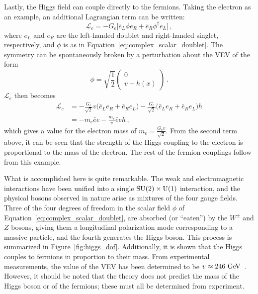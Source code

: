 Lastly, the Higgs field can couple directly to the fermions.
Taking the electron as an example, an additional Lagrangian term can be written:
\begin{equation}
\mathcal{L}_e = -G_e \big[\bar{e}_{L}\phi e_R+\bar{e}_R\phi^{\dagger}e_L\big]\,,
\end{equation}
where $e_L$ and $e_R$ are the left-handed doublet and right-handed singlet, respectively, and $\phi$ is as in Equation~\ref{eq:complex_scalar_doublet}.
The symmetry can be spontaneously broken by a perturbation about the VEV of the form
\begin{equation}
  \phi = \sqrt{\frac{1}{2}}
  \begin{pmatrix}
  0 \\ v+h(x)
  \end{pmatrix}\,.
\end{equation}
$\mathcal{L}_e$ then becomes
\begin{equation}
  \begin{aligned}
    \mathcal{L}_e &= -\frac{G_e}{\sqrt{2}}v\big(\bar{e}_{L}e_{R}+\bar{e}_{R}e_{L}\big) - \frac{G_e}{\sqrt{2}}\big(\bar{e}_{L}e_{R}+\bar{e}_{R}e_{L}\big)h \\
                  &= -m_e\bar{e}e-\frac{m_e}{v}\bar{e}eh\,,
  \end{aligned}
\end{equation}
which gives a value for the electron mass of $m_e = \frac{G_{e}v}{\sqrt{2}}$.
From the second term above, it can be seen that the strength of the Higgs coupling to the electron is proportional to the mass of the electron.
The rest of the fermion couplings follow from this example.

What is accomplished here is quite remarkable.
The weak and electromagnetic interactions have been unified into a single $\textrm{SU}(2)\times\textrm{U}(1)$ interaction, and the physical bosons observed in nature arise as mixtures of the four gauge fields.
Three of the four degrees of freedom in the scalar field $\phi$ of Equation~\ref{eq:complex_scalar_doublet}, are absorbed (or ``eaten'') by the $W^{\pm}$ and $Z$ bosons, giving them a longitudinal polarization mode corresponding to a massive particle, and the fourth generates the Higgs boson.
This process is summarized in Figure~\ref{fig:higgs_dof}.
Additionally, it is shown that the Higgs couples to fermions in proportion to their mass.
From experimental measurements, the value of the VEV has been determined to be $v\approx 246\gev$~\cite{2014.pdg}.
However, it should be noted that the theory does not predict the mass of the Higgs boson or of the fermions; these must all be determined from experiment.

